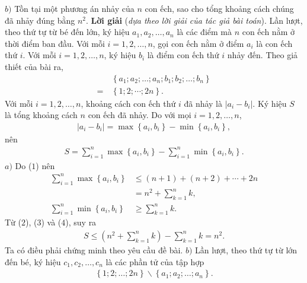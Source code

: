 \begin{multicols}{2}
	\vskip 0.05cm
	$b)$ Tồn tại một phương án nhảy của $n$ con ếch, sao cho tổng khoảng cách chúng đã nhảy đúng bằng $n^2$. 
	\vskip 0.05cm
	\textbf{\color{thachthuctoanhoc}Lời giải} (\textit{dựa theo lời giải của tác giả bài toán}).
	\vskip 0.05cm
	Lần lượt, theo thứ tự từ bé đến lớn, ký hiệu ${a_1},{a_2}, \ldots ,{a_n}$  là các điểm mà $n$ con ếch nằm ở thời điểm ban đầu.
	\vskip 0.05cm
	Với mỗi $i = 1, 2, \ldots, n$, gọi con ếch nằm ở điểm  $a_i$ là con ếch thứ $i$.
	\vskip 0.05cm
	Với mỗi $i = 1, 2, \ldots, n$, ký hiệu $b_i$  là điểm con ếch thứ $i$ nhảy đến.
	\vskip 0.05cm
	Theo giả thiết của bài ra,
	\begin{align*}
		&\left\{ {{a_1};{a_2}; \ldots ;{a_n};{b_1};{b_2}; \ldots ;{b_n}} \right\} \\[-0.5ex]
		= \,&\left\{ {1;2; \cdots ;2n} \right\}. \tag{$1$}
	\end{align*}
	Với mỗi $i = 1, 2, \ldots, n$, khoảng cách con ếch thứ $i$ đã nhảy là $\left| {{a_i} - {b_i}} \right|.$
	\vskip 0.05cm 
	Ký hiệu $S$ là tổng khoảng cách $n$ con ếch đã nhảy. Do với mọi $i = 1, 2, \ldots , n$,
	\begin{align*}
		\left| {{a_i} - {b_i}} \right| = \max \left\{ {{a_i},{b_i}} \right\} - \min \left\{ {{a_i},{b_i}} \right\},
	\end{align*}
	nên
	\begin{align*}
		S = \sum\limits_{i = 1}^n {\!\max \!\left\{ {{a_i},{b_i}} \right\}}  \!-\! \sum\limits_{i = 1}^n {\!\min\! \left\{ {{a_i},{b_i}} \right\}}.  \tag{$2$}
	\end{align*}
	$a)$ Do ($1$) nên
	\begin{align*}
		\sum\limits_{i = 1}^n {\max \left\{ {{a_i},{b_i}} \right\}}  &\!\le\! \left( {n \!+\! 1} \right) \!+\! \left( {n \!+\! 2} \right) \!+\!  \cdots  \!+\! 2n \\[-1.2ex]
		&= {n^2} + \sum\limits_{k = 1}^n k,  \tag{$3$}\\[-1ex]
	\sum\limits_{i = 1}^n {\min \left\{ {{a_i},{b_i}} \right\}}  &\ge \sum\limits_{k = 1}^n k. \tag{$4$}
\end{align*}
	Từ ($2$), ($3$) và ($4$), suy ra
	\begin{align*}
		S \le \left( {{n^2} + \sum\limits_{k = 1}^n k } \right) - \sum\limits_{k = 1}^n k  = {n^2}.
	\end{align*}
	Ta có điều phải chứng minh theo yêu cầu đề bài.
	\vskip 0.05cm
	$b)$ Lần lượt, theo thứ tự từ lớn đến bé, ký hiệu ${c_1},{c_2}, \ldots ,{c_n}$  là các phần tử của tập hợp
	\begin{align*}
		\left\{ {1;2; \ldots ;2n} \right\}\backslash \left\{ {{a_1};{a_2}; \ldots ;{a_n}} \right\}.

\end{align*}
\end{multicols}
